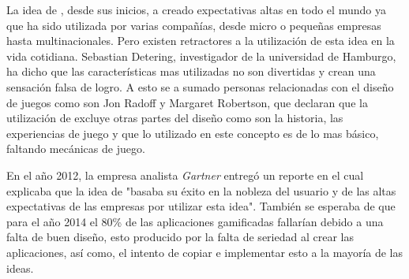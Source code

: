 La idea de {\GAM}, desde sus inicios, a creado expectativas altas en todo el mundo
ya que ha sido utilizada por varias compañías, desde micro o pequeñas empresas
hasta multinacionales.
Pero existen retractores a la utilización de esta idea en la vida cotidiana.
Sebastian Detering, investigador de la universidad de Hamburgo, ha dicho que las
características mas utilizadas no son divertidas y crean una sensación falsa de
logro\cite{Gam:Crit:1}.
A esto se a sumado personas relacionadas con el diseño de juegos como son
Jon Radoff y Margaret Robertson,  que declaran que la utilización de {\GAM}
excluye otras partes del diseño como son la historia, las experiencias de juego
y que lo utilizado en este concepto es de lo mas básico, faltando mecánicas de
juego\cite{Gam:Crit:2}.

En el año 2012, la empresa analista \emph{Gartner} entregó un
reporte\cite{Gam:Crit:3} en el cual explicaba que la idea de {\GAM}
"basaba su éxito en la nobleza del usuario y de las altas expectativas
de las empresas por utilizar esta idea".
También se esperaba de que para el año 2014 el 80\% de las aplicaciones
gamificadas fallarían debido a una falta de buen diseño,
esto producido por la falta de seriedad al crear las aplicaciones,
así como, el intento de copiar e implementar esto a la mayoría de las ideas.
